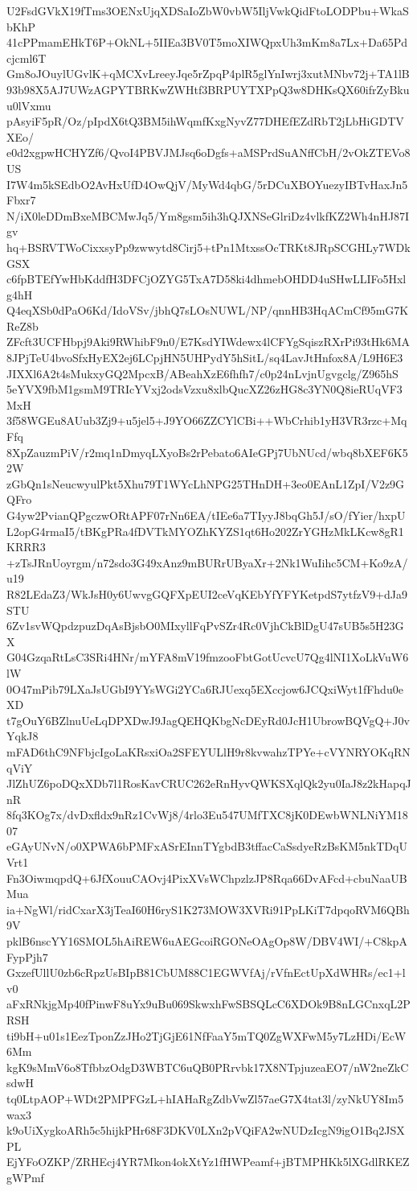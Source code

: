 U2FsdGVkX19fTms3OENxUjqXDSaIoZbW0vbW5IljVwkQidFtoLODPbu+WkaSbKhP
41cPPmamEHkT6P+OkNL+5IIEa3BV0T5moXIWQpxUh3mKm8a7Lx+Da65Pdcjcml6T
Gm8oJOuylUGvlK+qMCXvLreeyJqe5rZpqP4plR5glYnIwrj3xutMNbv72j+TA1lB
93b98X5AJ7UWzAGPYTBRKwZWHtf3BRPUYTXPpQ3w8DHKsQX60ifrZyBkuu0lVxmu
pAsyiF5pR/Oz/pIpdX6tQ3BM5ihWqmfKxgNyvZ77DHEfEZdRbT2jLbHiGDTVXEo/
e0d2xgpwHCHYZf6/QvoI4PBVJMJsq6oDgfs+aMSPrdSuANffCbH/2vOkZTEVo8US
I7W4m5kSEdbO2AvHxUfD4OwQjV/MyWd4qbG/5rDCuXBOYuezyIBTvHaxJn5Fbxr7
N/iX0leDDmBxeMBCMwJq5/Ym8gsm5ih3hQJXNSeGlriDz4vlkfKZ2Wh4nHJ87Igv
hq+BSRVTWoCixxsyPp9zwwytd8Cirj5+tPn1MtxssOcTRKt8JRpSCGHLy7WDkGSX
c6fpBTEfYwHbKddfH3DFCjOZYG5TxA7D58ki4dhmebOHDD4uSHwLLIFo5Hxlg4hH
Q4eqXSb0dPaO6Kd/IdoVSv/jbhQ7sLOsNUWL/NP/qnnHB3HqACmCf95mG7KReZ8b
ZFcft3UCFHbpj9Aki9RWhibF9n0/E7KsdYIWdewx4lCFYgSqiszRXrPi93tHk6MA
8JPjTeU4bvoSfxHyEX2ej6LCpjHN5UHPydY5hSitL/sq4LavJtHnfox8A/L9H6E3
JIXXl6A2t4sMukxyGQ2MpcxB/ABeahXzE6fhfh7/c0p24nLvjnUgvgclg/Z965hS
5eYVX9fbM1gsmM9TRIcYVxj2odsVzxu8xlbQucXZ26zHG8c3YN0Q8ieRUqVF3MxH
3f58WGEu8AUub3Zj9+u5jel5+J9YO66ZZCYlCBi++WbCrhib1yH3VR3rzc+MqFfq
8XpZauzmPiV/r2mq1nDmyqLXyoBs2rPebato6AIeGPj7UbNUcd/wbq8bXEF6K52W
zGbQn1sNeucwyulPkt5Xhu79T1WYcLhNPG25THnDH+3eo0EAnL1ZpI/V2z9GQFro
G4yw2PvianQPgczwORtAPF07rNn6EA/tIEe6a7TIyyJ8bqGh5J/sO/fYier/hxpU
L2opG4rmaI5/tBKgPRa4fDVTkMYOZhKYZS1qt6Ho202ZrYGHzMkLKcw8gR1KRRR3
+zTsJRnUoyrgm/n72sdo3G49xAnz9mBURrUByaXr+2Nk1WuIihc5CM+Ko9zA/u19
R82LEdaZ3/WkJsH0y6UwvgGQFXpEUI2ceVqKEbYfYFYKetpdS7ytfzV9+dJa9STU
6Zv1svWQpdzpuzDqAsBjsbO0MIxyllFqPvSZr4Rc0VjhCkBlDgU47sUB5s5H23GX
G04GzqaRtLsC3SRi4HNr/mYFA8mV19fmzooFbtGotUcvcU7Qg4lNI1XoLkVuW6lW
0O47mPib79LXaJsUGbI9YYsWGi2YCa6RJUexq5EXccjow6JCQxiWyt1fFhdu0eXD
t7gOuY6BZlnuUeLqDPXDwJ9JagQEHQKbgNcDEyRd0JcH1UbrowBQVgQ+J0vYqkJ8
mFAD6thC9NFbjcIgoLaKRsxiOa2SFEYULlH9r8kvwahzTPYe+cVYNRYOKqRNqViY
JlZhUZ6poDQxXDb7l1RosKavCRUC262eRnHyvQWKSXqlQk2yu0IaJ8z2kHapqJnR
8fq3KOg7x/dvDxfldx9nRz1CvWj8/4rlo3Eu547UMfTXC8jK0DEwbWNLNiYM1807
eGAyUNvN/o0XPWA6bPMFxASrEInnTYgbdB3tffacCaSsdyeRzBsKM5nkTDqUVrt1
Fn3OiwmqpdQ+6JfXouuCAOvj4PixXVsWChpzlzJP8Rqa66DvAFcd+cbuNaaUBMua
ia+NgWl/ridCxarX3jTeaI60H6ryS1K273MOW3XVRi91PpLKiT7dpqoRVM6QBh9V
pklB6nscYY16SMOL5hAiREW6uAEGcoiRGONeOAgOp8W/DBV4WI/+C8kpAFypPjh7
GxzefUllU0zb6cRpzUsBIpB81CbUM88C1EGWVfAj/rVfnEctUpXdWHRs/ec1+lv0
aFxRNkjgMp40fPinwF8uYx9uBu069SkwxhFwSBSQLcC6XDOk9B8nLGCnxqL2PRSH
ti9bH+u01s1EezTponZzJHo2TjGjE61NfFaaY5mTQ0ZgWXFwM5y7LzHDi/EcW6Mm
kgK9sMmV6o8TfbbzOdgD3WBTC6uQB0PRrvbk17X8NTpjuzeaEO7/nW2neZkCsdwH
tq0LtpAOP+WDt2PMPFGzL+hIAHaRgZdbVwZl57aeG7X4tat3l/zyNkUY8Im5wax3
k9oUiXygkoARh5c5hijkPHr68F3DKV0LXn2pVQiFA2wNUDzIcgN9igO1Bq2JSXPL
EjYFoOZKP/ZRHEcj4YR7Mkon4okXtYz1fHWPeamf+jBTMPHKk5lXGdlRKEZgWPmf
